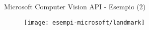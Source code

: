 %
\begin{frame}[t]{Microsoft Computer Vision API - Esempio (2)}
	\begin{figure}[h]
	\centering
	    \texttt{[image: esempi-microsoft/landmark]}
		\label{fig:esempio-microsoft-2}
	\end{figure}
\end{frame}
%
